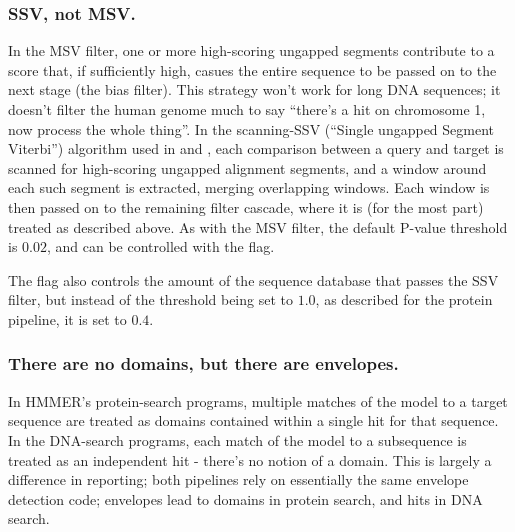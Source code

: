 \subsubsection{SSV, not MSV.}

In the MSV filter, one or more high-scoring ungapped segments contribute to a
score that, if sufficiently high, casues the entire sequence to be passed on to
the next stage (the bias filter). This strategy won't work for long
DNA sequences; it doesn't filter the human genome much to say ``there's a hit on
chromosome 1, now process the whole thing''. In the scanning-SSV (``Single
ungapped Segment Viterbi'') algorithm used in  and
, each comparison between a query and target is
scanned for high-scoring ungapped alignment segments, and a window around each 
such segment is extracted, merging overlapping windows. Each window is then
passed on to the remaining filter cascade, where it is (for the most part)
treated as described above. As with the MSV filter, the default P-value 
threshold is $0.02$, and can be controlled with the  flag.

The  flag also controls the amount of the sequence database that
passes the SSV filter, but instead of the threshold being set to $1.0$, as
described for the protein pipeline, it is set to $0.4$.



\subsubsection{There are no domains, but there are envelopes.}

In HMMER's protein-search programs, multiple matches of the model to a target
sequence are treated as domains contained within a single hit for that
sequence. In the DNA-search programs, each match of the model to a subsequence
is treated as an independent hit - there's no notion of a domain. This is
largely a difference in reporting; both pipelines rely on essentially the same 
envelope detection code; envelopes lead to domains in protein search, and
hits in DNA search.


